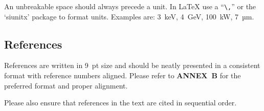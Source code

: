An unbreakable space should always precede a unit. In \LaTeX{} use
a “\verb|\,|” or the ‘siunitx’ package to format units.
Examples are:
\SI{3}{keV}, \SI{4}{GeV}, \SI{100}{kW}, \SI{7}{µm}.

\subsection{References}

References are written in \SI{9}{pt} size and should be neatly
presented in a consistent format with reference numbers
aligned. Please refer to \textbf{ANNEX~B} for the preferred format
and proper alignment.

Please also ensure that references in the text are cited in
sequential order.

\flushend
